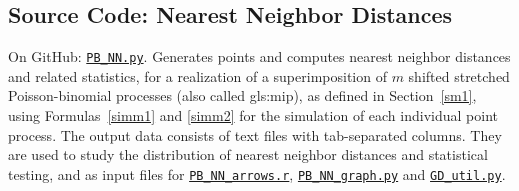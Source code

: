 \documentclass[10pt]{article}
\begin{document}
\subsection{Source Code: Nearest Neighbor Distances}\label{nnsc}

{On GitHub}: \href{https://github.com/VincentGranville/Point-Processes/blob/main/Source\%20Code/PB_NN.py}{\texttt{PB\_NN.py}}. Generates points and computes \textcolor{index}{nearest neighbor distances} and related statistics, for a realization of a superimposition
of $m$ shifted stretched Poisson-binomial processes (also called \gls{gls:mip}), as defined in Section~\ref{sm1}, using Formulas~\ref{simm1} and
\ref{simm2} for the simulation of each individual point process. The output data consists of text files with tab-separated columns. They are used to study the distribution of nearest neighbor distances and statistical testing,
and as input files for 
    \href{https://github.com/VincentGranville/Point-Processes/blob/main/Source\%20Code/PP_NN_arrows.r}{\texttt{PB\_NN\_arrows.r}}, 
    \href{https://github.com/VincentGranville/Point-Processes/blob/main/Source\%20Code/PB_NN_graph.py}{\texttt{PB\_NN\_graph.py}} and 
    \href{https://github.com/VincentGranville/Point-Processes/blob/main/Source\%20Code/GD_util.py}{\texttt{GD\_util.py}}. 
\end{document}
